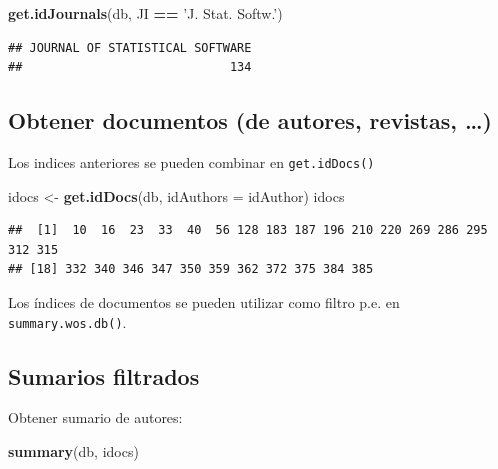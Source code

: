 \documentclass[]{book}
\newenvironment{Shaded}{\begin{snugshade}}{\end{snugshade}}
\newcommand{\KeywordTok}[1]{\textcolor[rgb]{0.13,0.29,0.53}{\textbf{#1}}}
\newcommand{\DataTypeTok}[1]{\textcolor[rgb]{0.13,0.29,0.53}{#1}}
\newcommand{\StringTok}[1]{\textcolor[rgb]{0.31,0.60,0.02}{#1}}
\newcommand{\OperatorTok}[1]{\textcolor[rgb]{0.81,0.36,0.00}{\textbf{#1}}}
\newcommand{\NormalTok}[1]{#1}
\begin{document}
\begin{itemize}
\begin{Shaded}
\begin{Highlighting}[]
\KeywordTok{get.idJournals}\NormalTok{(db, JI }\OperatorTok{==}\StringTok{ 'J. Stat. Softw.'}\NormalTok{)}
\end{Highlighting}
\end{Shaded}

\begin{verbatim}
## JOURNAL OF STATISTICAL SOFTWARE 
##                             134
\end{verbatim}
\end{itemize}

\subsection{Obtener documentos (de autores, revistas,
\ldots{})}\label{obtener-documentos-de-autores-revistas}

Los indices anteriores se pueden combinar en \texttt{get.idDocs()}

\begin{Shaded}
\begin{Highlighting}[]
\NormalTok{idocs <-}\StringTok{ }\KeywordTok{get.idDocs}\NormalTok{(db, }\DataTypeTok{idAuthors =}\NormalTok{ idAuthor)}
\NormalTok{idocs}
\end{Highlighting}
\end{Shaded}

\begin{verbatim}
##  [1]  10  16  23  33  40  56 128 183 187 196 210 220 269 286 295 312 315
## [18] 332 340 346 347 350 359 362 372 375 384 385
\end{verbatim}

Los índices de documentos se pueden utilizar como filtro p.e. en
\texttt{summary.wos.db()}.

\subsection{Sumarios filtrados}\label{sumarios-filtrados}

Obtener sumario de autores:

\begin{Shaded}
\begin{Highlighting}[]
\KeywordTok{summary}\NormalTok{(db, idocs)}
\end{Highlighting}
\end{Shaded}
\end{document}
